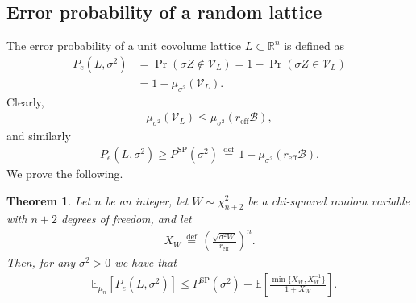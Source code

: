 \documentclass[article,doublecolumn]{IEEEtran}
\newcommand{\EE}{{\mathbb{E}}}
\newcommand{\df}{{\, \stackrel{\mathrm{def}}{=}\, }}
\newcommand{\R}{{\mathbb{R}}}
\newcommand{\Ind}{\mathds{1}}
\newcommand{\mVL}{{\mathcal{V}_L}}
\newcommand{\mBeuc}{{\mathcal{B}}}
\newcommand{\reff}{{r_{\mathrm{eff}}}}
\newtheorem{thm}{Theorem}[section]
\begin{document}
\subsection{Error probability of a random lattice}
The error probability of a unit covolume lattice $L\subset\R^n$ is defined as
\begin{align}
P_e(L,\sigma^2)&=\Pr(\sigma Z\notin \mVL)=1-\Pr(\sigma Z\in \mVL)\\
&=1-\mu_{\sigma^2}(\mVL).    
\end{align}
Clearly,
\begin{align}
\mu_{\sigma^2}(\mVL)\leq \mu_{\sigma^2}(\reff\mBeuc),
\end{align}
and similarly
\begin{align}
P_e(L,\sigma^2)\geq P^{\mathrm{SP}}(\sigma^2)\df1-\mu_{\sigma^2}(\reff\mBeuc).
\end{align}
We prove the following.
\begin{thm}
Let $n$ be an integer, let $W\sim\chi^2_{n+2}$ be a chi-squared random variable with $n+2$ degrees of freedom, and let
\begin{align}
X_W\df \left(\frac{\sqrt{\sigma^2 W}}{\reff}\right)^n.
\label{eq:XwDef}
\end{align}
Then, for any $\sigma^2>0$ we have that
\begin{align}
&\EE_{\mu_n}[P_e(L,\sigma^2)]\leq P^{\mathrm{SP}}(\sigma^2)+\EE\left[\frac{\min\{X_W,X^{-1}_W\}}{1+X_W} \right].
\label{eq:LatticePeUBfull2}
\end{align}
\label{thm:latticeSPUB2}
\end{thm}
\end{document}
